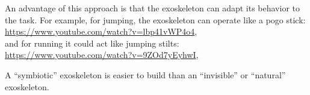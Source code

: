 An advantage of this approach is that 
the exoskeleton can adapt its behavior to the task.
For example, for jumping, the exoskeleton can operate like a pogo 
stick:\\
\url{https://www.youtube.com/watch?v=lbp41vWP4o4},\\ 
and for running it could act like jumping stilts:\\
\url{https://www.youtube.com/watch?v=9ZOd7yEyhwI},

A ``symbiotic'' exoskeleton is easier to build than an ``invisible'' or ``natural''
exoskeleton.
